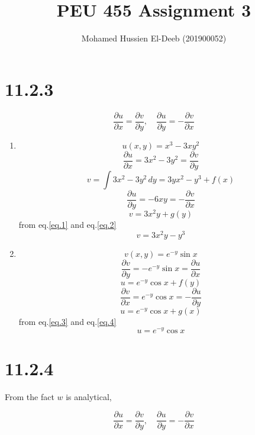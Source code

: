 \documentclass[12pt]{article}
\title{PEU 455 Assignment 3}
\author{Mohamed Hussien El-Deeb (201900052)}
\date{}
\begin{document}
\maketitle
\tableofcontents

\newcommand{\Lagr}{\mathcal{L}}
\renewcommand{\labelenumi}{\textbf{(\alph{enumi})}}
\newcommand{\mbeq}{\overset{!}{=}}

\newpage
\section{11.2.3}

\[
    \frac{\partial u}{\partial x} = \frac{\partial v}{\partial y},
    \quad \frac{\partial u}{\partial y} = -\frac{\partial v}{\partial x}
\]

\begin{enumerate}
    \item \[
              u(x, y) = x^3 - 3xy^2
          \]
          \[
              \frac{\partial u}{\partial x} = 3x^2-3y^2 = \frac{\partial v}{\partial y}
          \]
          \[
              v = \int 3x^2-3y^2\, dy = 3yx^2-y^3 + f(x) \tag{1}\label{eq.1}
          \]
          \[
              \frac{\partial u}{\partial y} = - 6xy = -\frac{\partial v}{\partial x}
          \]
          \[
              v = 3x^2y + g(y) \tag{2}\label{eq.2}
          \]
          from eq.\ref{eq.1} and eq.\ref{eq.2}
          \[
              v = 3x^2y - y^3
          \]
    \item \[
              v(x, y) = e^{-y}\sin x
          \]
          \[
              \frac{\partial v}{\partial y} = -e^{-y}\sin x = \frac{\partial u}{\partial x}
          \]
          \[
              u = e^{-y}\cos x + f(y) \tag{3}\label{eq.3}
          \]
          \[
              \frac{\partial v}{\partial x} = e^{-y}\cos x = - \frac{\partial u}{\partial y}
          \]
          \[
              u = e^{-y}\cos x + g(x) \tag{4}\label{eq.4}
          \]
          from eq.\ref{eq.3} and eq.\ref{eq.4}
          \[
              u = e^{-y}\cos x
          \]
\end{enumerate}

\newpage
\section{11.2.4}

From the fact $w$ is analytical,

\[
    \frac{\partial u}{\partial x} = \frac{\partial v}{\partial y},
    \quad \frac{\partial u}{\partial y} = -\frac{\partial v}{\partial x}
\]
\end{document}
